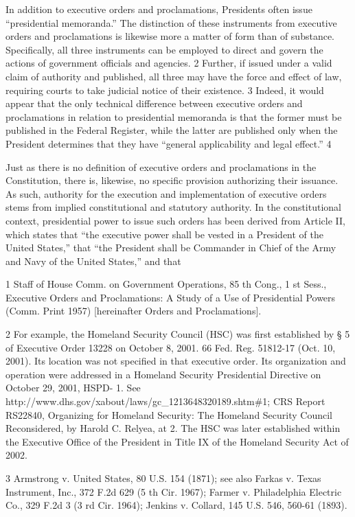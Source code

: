 \documentclass[11pt,a4paper]{article}
\begin{document}
In addition to executive orders and proclamations, Presidents often issue “presidential memoranda.” The distinction of these instruments from executive orders and proclamations is likewise more a matter of form than of substance. Specifically, all three instruments can be employed to direct and govern the actions of government officials and agencies. 2 Further, if issued under a valid claim of authority and published, all three may have the force and effect of law, requiring courts to take judicial notice of their existence. 3 Indeed, it would appear that the only technical difference between executive orders and proclamations in relation to presidential memoranda is that the former must be published in the Federal Register, while the latter are published only when the President determines that they have “general applicability and legal effect.” 4

Just as there is no definition of executive orders and proclamations in the Constitution, there is, likewise, no specific provision authorizing their issuance. As such, authority for the execution and implementation of executive orders stems from implied constitutional and statutory authority. In the constitutional context, presidential power to issue such orders has been derived from Article II, which states that “the executive power shall be vested in a President of the United States,” that “the President shall be Commander in Chief of the Army and Navy of the United States,” and that

1 Staff of House Comm. on Government Operations, 85 th Cong., 1 st Sess., Executive Orders and Proclamations: A Study of a Use of Presidential Powers (Comm. Print 1957) [hereinafter Orders and Proclamations].

2 For example, the Homeland Security Council (HSC) was first established by § 5 of Executive Order 13228 on October 8, 2001. 66 Fed. Reg. 51812-17 (Oct. 10, 2001). Its location was not specified in that executive order. Its organization and operation were addressed in a Homeland Security Presidential Directive on October 29, 2001, HSPD- 1. See http://www.dhs.gov/xabout/laws/gc\_1213648320189.shtm\#1; CRS Report RS22840, Organizing for Homeland Security: The Homeland Security Council Reconsidered, by Harold C. Relyea, at 2. The HSC was later established within the Executive Office of the President in Title IX of the Homeland Security Act of 2002.

3 Armstrong v. United States, 80 U.S. 154 (1871); see also Farkas v. Texas Instrument, Inc., 372 F.2d 629 (5 th Cir. 1967); Farmer v. Philadelphia Electric Co., 329 F.2d 3 (3 rd Cir. 1964); Jenkins v. Collard, 145 U.S. 546, 560-61 (1893).
\end{document}
